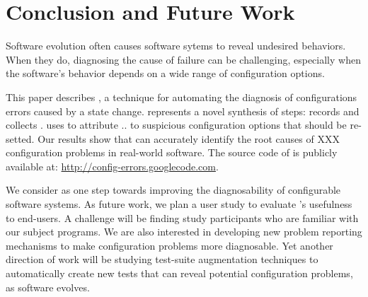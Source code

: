 \section{Conclusion and Future Work}
\label{sec:conclusion}

Software evolution often causes software sytems to
reveal undesired behaviors.
When they do, diagnosing the cause of failure
can be challenging, especially when the software's
behavior depends on a wide range of configuration options.

This paper describes \ourtool, a technique for
automating the diagnosis of configurations errors
caused by a state change.  \ourtool
represents a novel synthesis of \todo{} steps:
records \todo{} and collects \todo{}.
\ourtool uses \todo{} to attribute .. to
suspicious configuration options that should
be re-setted. Our results show that \ourtool
can accurately identify the root causes of
XXX configuration problems in real-world software.
The source code of \ourtool is publicly available
at: \url{http://config-errors.googlecode.com}.

We consider \ourtool as one step towards improving
the diagnosability of configurable software systems.
As future work, we plan a user study to evaluate
\ourtool's usefulness to end-users. A challenge
will be finding study participants who are familiar
with our subject programs. We are also interested
in developing new problem reporting mechanisms to
make configuration problems more diagnosable.
Yet another direction of work will be studying
test-suite augmentation techniques to automatically
create new tests that can reveal potential configuration
problems, as software evolves.
